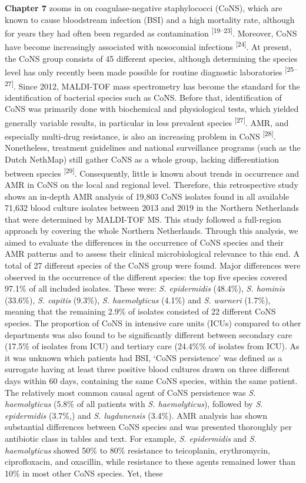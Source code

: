 \documentclass[
]{book}
\begin{document}
\textbf{Chapter 7} zooms in on coagulase-negative staphylococci (CoNS), which are known to cause bloodstream infection (BSI) and a high mortality rate, although for years they had often been regarded as contamination \textsuperscript{{[}19--23{]}}. Moreover, CoNS have become increasingly associated with nosocomial infections \textsuperscript{{[}24{]}}. At present, the CoNS group consists of 45 different species, although determining the species level has only recently been made possible for routine diagnostic laboratories \textsuperscript{{[}25--27{]}}. Since 2012, MALDI-TOF mass spectrometry has become the standard for the identification of bacterial species such as CoNS. Before that, identification of CoNS was primarily done with biochemical and physiological tests, which yielded generally variable results, in particular in less prevalent species \textsuperscript{{[}27{]}}. AMR, and especially multi-drug resistance, is also an increasing problem in CoNS \textsuperscript{{[}28{]}}. Nonetheless, treatment guidelines and national surveillance programs (such as the Dutch NethMap) still gather CoNS as a whole group, lacking differentiation between species \textsuperscript{{[}29{]}}. Consequently, little is known about trends in occurrence and AMR in CoNS on the local and regional level. Therefore, this retrospective study shows an in-depth AMR analysis of 19,803 CoNS isolates found in all available 71,632 blood culture isolates between 2013 and 2019 in the Northern Netherlands that were determined by MALDI-TOF MS. This study followed a full-region approach by covering the whole Northern Netherlands. Through this analysis, we aimed to evaluate the differences in the occurrence of CoNS species and their AMR patterns and to assess their clinical microbiological relevance to this end. A total of 27 different species of the CoNS group were found. Major differences were observed in the occurrence of the different species: the top five species covered 97.1\% of all included isolates. These were: \emph{S. epidermidis} (48.4\%), \emph{S. hominis} (33.6\%), \emph{S. capitis} (9.3\%), \emph{S. haemolyticus} (4.1\%) and \emph{S. warneri} (1.7\%), meaning that the remaining 2.9\% of isolates consisted of 22 different CoNS species. The proportion of CoNS in intensive care units (ICUs) compared to other departments was also found to be significantly different between secondary care (17.5\% of isolates from ICU) and tertiary care (24.4\%\% of isolates from ICU). As it was unknown which patients had BSI, `CoNS persistence' was defined as a surrogate having at least three positive blood cultures drawn on three different days within 60 days, containing the same CoNS species, within the same patient. The relatively most common causal agent of CoNS persistence was \emph{S. haemolyticus} (5.8\% of all patients with \emph{S. haemolyticus}), followed by \emph{S. epidermidis} (3.7\%,) and \emph{S. lugdunensis} (3.4\%). AMR analysis has shown substantial differences between CoNS species and was presented thoroughly per antibiotic class in tables and text. For example, \emph{S. epidermidis} and \emph{S. haemolyticus} showed 50\% to 80\% resistance to teicoplanin, erythromycin, ciprofloxacin, and oxacillin, while resistance to these agents remained lower than 10\% in most other CoNS species. Yet, these 
\end{document}
